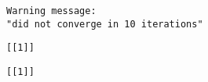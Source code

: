 \documentclass[11pt]{article}
\begin{document}
    \begin{Verbatim}[commandchars=\\\{\}]
Warning message:
"did not converge in 10 iterations"
    \end{Verbatim}

    
    \begin{verbatim}
[[1]]

    \end{verbatim}

    
    
    \begin{verbatim}
[[1]]

    \end{verbatim}

    
    \begin{center}
    \end{center}
    { \hspace*{\fill} \\}
    
    \begin{center}
    \end{center}
    { \hspace*{\fill} \\}
    
    \begin{center}
    \end{center}
    { \hspace*{\fill} \\}
    
    \begin{center}
    \end{center}
    { \hspace*{\fill} \\}
    
\end{document}
